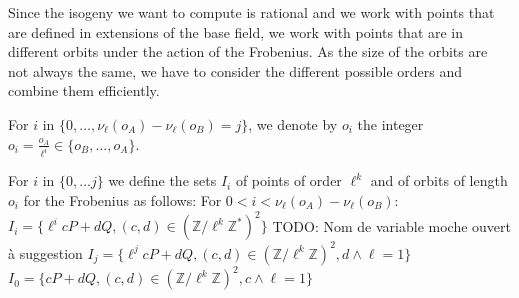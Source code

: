 \documentclass{lms}
\newcommand{\todo}[1]{{\color{red}TODO: #1}}
\begin{document}

Since the isogeny we want to compute is rational and we work with
points that are defined in extensions of the base field, we work
with points that are in different orbits under the action of the
Frobenius. As the size of the orbits are not always the same, we 
have to consider the different possible orders and combine them
efficiently.

\begin{defi}
  For $i$ in $\{0, \dots,\nu_{\ell}(o_A)-\nu_{\ell}(o_B)=j\}$, we denote by $o_i$
  the integer $o_i =\frac{o_A}{\ell^i} \in \{o_B,\dots,o_A\}$.
\end{defi}




\begin{defi}
For $i$ in $\{0,\dots j\}$ we define the sets
$I_i$ of points of order $\ell^k$ and of orbits of length $o_i$ for the Frobenius as follows:
\newline
For $0 < i < \nu_{\ell}(o_A)-\nu_{\ell}(o_B)$:
$I_i=\{ \ell^i c P + d Q, (c,d) \in \left( \mathbb{Z}/ \ell^k \mathbb{Z}^{*} \right)^2 \} $ \todo{Nom de variable moche ouvert à suggestion}
\newline
$I_j=\{ \ell^j c P + d Q, (c,d) \in \left( \mathbb{Z}/ \ell^k \mathbb{Z} \right)^2, d \wedge \ell =1 \} $
\newline
$I_0=\{ c P + d Q, (c,d) \in \left( \mathbb{Z}/ \ell^k \mathbb{Z} \right)^2, c \wedge \ell =1 \}$
\end{defi}
\end{document}
